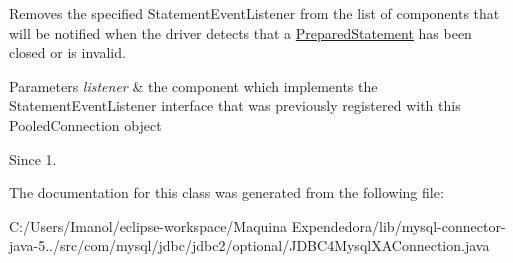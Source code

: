 Removes the specified {\ttfamily Statement\+Event\+Listener} from the list of components that will be notified when the driver detects that a {\ttfamily \mbox{\hyperlink{classcom_1_1mysql_1_1jdbc_1_1_prepared_statement}{Prepared\+Statement}}} has been closed or is invalid.


\begin{DoxyParams}{Parameters}
{\em listener} & the component which implements the {\ttfamily Statement\+Event\+Listener} interface that was previously registered with this {\ttfamily Pooled\+Connection} object \\
\hline
\end{DoxyParams}
\begin{DoxySince}{Since}
1. 
\end{DoxySince}


The documentation for this class was generated from the following file\+:\begin{DoxyCompactItemize}
\item 
C\+:/\+Users/\+Imanol/eclipse-\/workspace/\+Maquina Expendedora/lib/mysql-\/connector-\/java-\/5../src/com/mysql/jdbc/jdbc2/optional/J\+D\+B\+C4\+Mysql\+X\+A\+Connection.\+java\end{DoxyCompactItemize}
